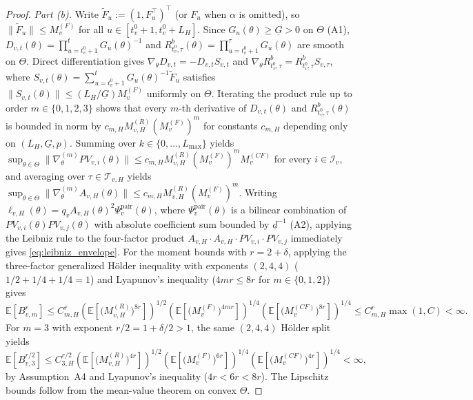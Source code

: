 \begin{proof}
\emph{Part (b).} Write $\tilde{F}_u := (1, F_u^\top)^\top$ (or $F_u$ when $\alpha$ is omitted), so $\|\tilde{F}_u\| \le M_v^{(F)}$ for all $u \in [t_v^0+1, t_v^0+L_H]$. Since $G_u(\theta) \ge \underline{G} > 0$ on $\Theta$ (A1), $D_{v,t}(\theta) = \prod_{u=t_v^0+1}^t G_u(\theta)^{-1}$ and $R^b_{t_v^0,\tau}(\theta) = \prod_{u=t_v^0+1}^\tau G_u(\theta)$ are smooth on $\Theta$. Direct differentiation gives $\nabla_\theta D_{v,t} = -D_{v,t} S_{v,t}$ and $\nabla_\theta R^b_{t_v^0,\tau} = R^b_{t_v^0,\tau} S_{v,\tau}$, where $S_{v,t}(\theta) = \sum_{u=t_v^0+1}^t G_u(\theta)^{-1}\tilde{F}_u$ satisfies $\|S_{v,t}(\theta)\| \le (L_H/\underline{G}) M_v^{(F)}$ uniformly on $\Theta$. Iterating the product rule up to order $m \in \{0,1,2,3\}$ shows that every $m$-th derivative of $D_{v,t}(\theta)$ and $R^b_{t_v^0,\tau}(\theta)$ is bounded in norm by $c_{m,H} M_{v,H}^{(R)} (M_v^{(F)})^m$ for constants $c_{m,H}$ depending only on $(L_H, \underline{G}, p)$. Summing over $k \in \{0,\dots,L_{\max}\}$ yields $\sup_{\theta\in\Theta}\|\nabla_\theta^{(m)} PV_{v,i}(\theta)\| \le c_{m,H} M_{v,H}^{(R)} (M_v^{(F)})^m M_v^{(CF)}$ for every $i \in \mathcal{I}_v$, and averaging over $\tau \in \mathcal{T}_{v,H}$ yields $\sup_{\theta\in\Theta}\|\nabla_\theta^{(m)} A_{v,H}(\theta)\| \le c_{m,H} M_{v,H}^{(R)} (M_v^{(F)})^m$. Writing $\ell_{v,H}(\theta) = q_v A_{v,H}(\theta)^2 \Psi_v^{\mathrm{pair}}(\theta)$, where $\Psi_v^{\mathrm{pair}}(\theta)$ is a bilinear combination of $PV_{v,i}(\theta) PV_{v,j}(\theta)$ with absolute coefficient sum bounded by $\underline{d}^{-1}$ (A2), applying the Leibniz rule to the four-factor product $A_{v,H} \cdot A_{v,H} \cdot PV_{v,i} \cdot PV_{v,j}$ immediately gives \eqref{eq:leibniz_envelope}.
For the moment bounds with $r = 2 + \delta$, applying the three-factor generalized H\"older inequality with exponents $(2, 4, 4)$ ($1/2 + 1/4 + 1/4 = 1$) and Lyapunov's inequality ($4mr \le 8r$ for $m \in \{0,1,2\}$) gives
\[
\mathbb{E}\!\left[B_{v,m}^r\right]
\le C_{m,H}^r
\left(\mathbb{E}\!\left[\bigl(M_{v,H}^{(R)}\bigr)^{8r}\right]\right)^{1/2}
\left(\mathbb{E}\!\left[\bigl(M_v^{(F)}\bigr)^{4mr}\right]\right)^{1/4}
\left(\mathbb{E}\!\left[\bigl(M_v^{(CF)}\bigr)^{8r}\right]\right)^{1/4}
\le C_{m,H}^r \max(1, C) < \infty.
\] For $m = 3$ with exponent $r/2 = 1 + \delta/2 > 1$, the same $(2,4,4)$ H\"older split yields
\[
\mathbb{E}\!\left[B_{v,3}^{r/2}\right]
\le C_{3,H}^{r/2}
\left(\mathbb{E}\!\left[\bigl(M_{v,H}^{(R)}\bigr)^{4r}\right]\right)^{1/2}
\left(\mathbb{E}\!\left[\bigl(M_v^{(F)}\bigr)^{6r}\right]\right)^{1/4}
\left(\mathbb{E}\!\left[\bigl(M_v^{(CF)}\bigr)^{4r}\right]\right)^{1/4}
< \infty,
\]
by Assumption~A4 and Lyapunov's inequality ($4r < 6r < 8r$). The Lipschitz bounds follow from the mean-value theorem on convex $\Theta$.


\end{proof}

